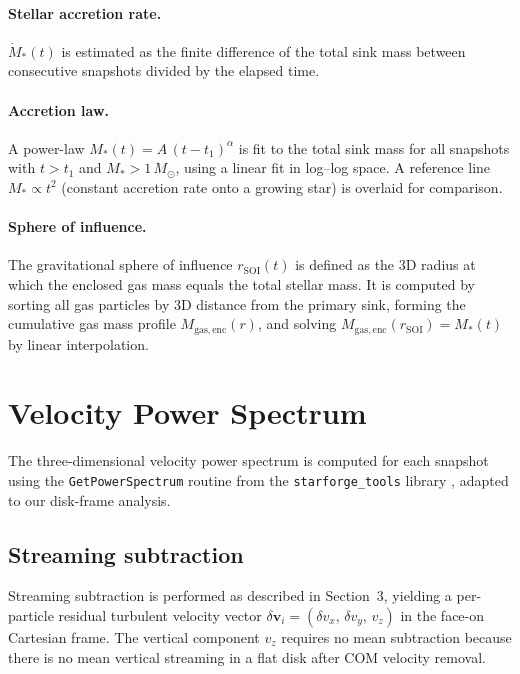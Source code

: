 \documentclass[12pt]{article}
\begin{document}
\paragraph{Stellar accretion rate.}
$\dot{M}_*(t)$ is estimated as the finite difference of the total sink mass
between consecutive snapshots divided by the elapsed time.

\paragraph{Accretion law.}
A power-law $M_*(t) = A\,(t - t_1)^\alpha$ is fit to the total sink mass for all
snapshots with $t > t_1$ and $M_* > 1\,M_\odot$, using a linear fit in log--log
space. A reference line $M_* \propto t^2$ (constant accretion rate onto a growing
star) is overlaid for comparison.

\paragraph{Sphere of influence.}
The gravitational sphere of influence $r_\mathrm{SOI}(t)$ is defined as the
3D radius at which the enclosed gas mass equals the total stellar mass. It is
computed by sorting all gas particles by 3D distance from the primary sink,
forming the cumulative gas mass profile $M_\mathrm{gas,enc}(r)$, and solving
$M_\mathrm{gas,enc}(r_\mathrm{SOI}) = M_*(t)$ by linear interpolation.


\section{Velocity Power Spectrum}

The three-dimensional velocity power spectrum is computed for each snapshot using
the \texttt{GetPowerSpectrum} routine from the \texttt{starforge\_tools} library
\cite{grudic2021}, adapted to our disk-frame analysis.

\subsection*{Streaming subtraction}

Streaming subtraction is performed as described in Section~3, yielding a
per-particle residual turbulent velocity vector
$\delta\mathbf{v}_i = (\delta v_x,\,\delta v_y,\,v_z)$ in the face-on Cartesian
frame. The vertical component $v_z$ requires no mean subtraction because there is
no mean vertical streaming in a flat disk after COM velocity removal.
\end{document}
